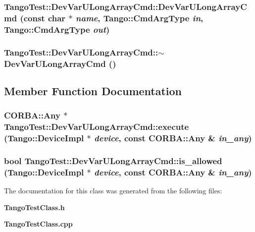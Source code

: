 \subsubsection{\setlength{\rightskip}{0pt plus 5cm}Tango\-Test::Dev\-Var\-ULong\-Array\-Cmd::Dev\-Var\-ULong\-Array\-Cmd (const char $\ast$ {\em name}, Tango::Cmd\-Arg\-Type {\em in}, Tango::Cmd\-Arg\-Type {\em out})}\label{classTangoTest_1_1DevVarULongArrayCmd_a1}


\subsubsection{\setlength{\rightskip}{0pt plus 5cm}Tango\-Test::Dev\-Var\-ULong\-Array\-Cmd::$\sim$Dev\-Var\-ULong\-Array\-Cmd ()\hspace{0.3cm}{\tt  [inline]}}\label{classTangoTest_1_1DevVarULongArrayCmd_a2}




\subsection{Member Function Documentation}
\subsubsection{\setlength{\rightskip}{0pt plus 5cm}CORBA::Any $\ast$ Tango\-Test::Dev\-Var\-ULong\-Array\-Cmd::execute (Tango::Device\-Impl $\ast$ {\em device}, const CORBA::Any \& {\em in\_\-any})\hspace{0.3cm}{\tt  [virtual]}}\label{classTangoTest_1_1DevVarULongArrayCmd_a4}


\subsubsection{\setlength{\rightskip}{0pt plus 5cm}bool Tango\-Test::Dev\-Var\-ULong\-Array\-Cmd::is\_\-allowed (Tango::Device\-Impl $\ast$ {\em device}, const CORBA::Any \& {\em in\_\-any})\hspace{0.3cm}{\tt  [virtual]}}\label{classTangoTest_1_1DevVarULongArrayCmd_a3}




The documentation for this class was generated from the following files:\begin{CompactItemize}
\item 
{\bf Tango\-Test\-Class.h}\item 
{\bf Tango\-Test\-Class.cpp}\end{CompactItemize}

